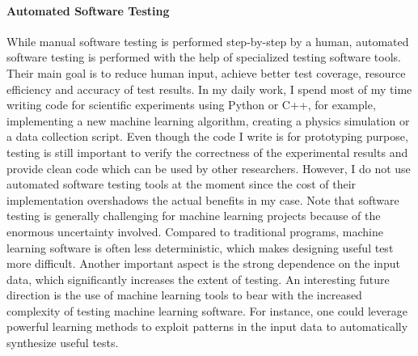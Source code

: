 \documentclass[11pt]{article}
\begin{document}
\paragraph{Automated Software Testing}  While manual software testing is performed step-by-step by a human, automated software testing is performed with the help of specialized testing software tools. Their main goal is to reduce human input, achieve better test coverage, resource efficiency and accuracy of test results. In my daily work, I spend most of my time writing code for scientific experiments using Python or C++, for example, implementing a new machine learning algorithm, creating a physics simulation or a data collection script. Even though the code I write is for prototyping purpose, testing is still important to verify the correctness of the experimental results and provide clean code which can be used by other researchers. However, I do not use automated software testing tools at the moment since the cost of their implementation overshadows the actual benefits in my case. Note that software testing is generally challenging for machine learning projects because of the enormous uncertainty involved. Compared to traditional programs, machine learning software is often less deterministic, which makes designing useful test more difficult. Another important aspect is the strong dependence on the input data, which significantly increases the extent of testing. An interesting future direction is the use of machine learning tools to bear with the increased complexity of testing machine learning software. For instance, one could leverage powerful learning methods to exploit patterns in the input data to automatically synthesize useful tests.   
\end{document}
